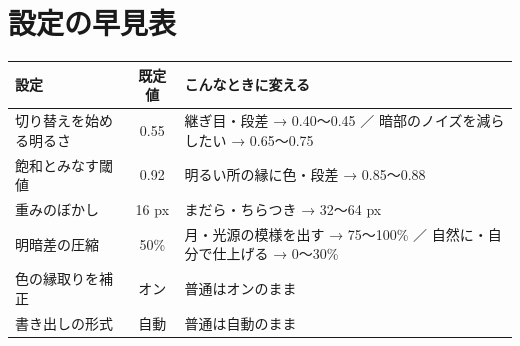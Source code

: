 \documentclass[paper=a4paper,fontsize=11pt,report,jafontsize=11pt]{jlreq}
\begin{document}
\section{設定の早見表}
\begin{center}
\begin{tabularx}{\linewidth}{l c X}
\toprule
設定 & 既定値 & こんなときに変える \\ \midrule
切り替えを始める明るさ & 0.55 & 継ぎ目・段差 → 0.40〜0.45 ／ 暗部のノイズを減らしたい → 0.65〜0.75 \\
飽和とみなす閾値 & 0.92 & 明るい所の縁に色・段差 → 0.85〜0.88 \\
重みのぼかし & 16 px & まだら・ちらつき → 32〜64 px \\
明暗差の圧縮 & 50\% & 月・光源の模様を出す → 75〜100\% ／ 自然に・自分で仕上げる → 0〜30\% \\
色の縁取りを補正 & オン & 普通はオンのまま \\
書き出しの形式 & 自動 & 普通は自動のまま \\
\bottomrule
\end{tabularx}
\end{center}
\end{document}
